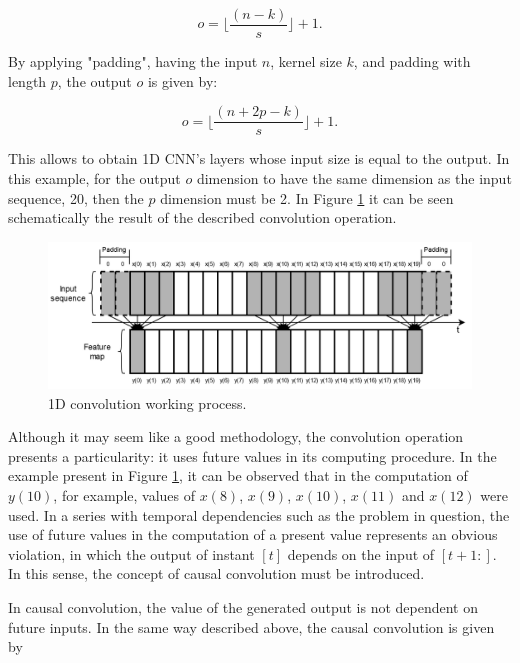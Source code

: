 \begin{equation}
    o = \lfloor \frac{(n-k)}{s} \rfloor + 1 .
\end{equation}

By applying "padding", having the input $n$, kernel size $k$, and padding with length $p$, the output $o$ is given by:

\begin{equation}
    o = \lfloor \frac{(n+2p-k)}{s} \rfloor + 1 .
\end{equation}

This allows to obtain \ac{1D CNN}'s layers whose input size is equal to the output. In this example, for the output $o$ dimension to have the same dimension as the input sequence, 20, then the $p$ dimension must be 2. In Figure \ref{conv1} it can be seen schematically the result of the described convolution operation.

\begin{figure}[h!]
    \centering
    \begin{center}
    \includegraphics[width=1\textwidth]{Images/conv1.png}
    \caption{1D convolution working process.}
    \label{conv1}
    \end{center}
\end{figure}

Although it may seem like a good methodology, the convolution operation presents a particularity: it uses future values in its computing procedure. In the example present in Figure \ref{conv1}, it can be observed that in the computation of $y(10)$, for example, values of $x(8)$, $x(9)$, $x(10)$, $x(11)$ and $x(12)$ were used. In a series with temporal dependencies such as the problem in question, the use of future values in the computation of a present value represents an obvious violation, in which the output of instant $[t]$ depends on the input of $[t+1:]$. In this sense, the concept of causal convolution must be introduced. 

In causal convolution, the value of the generated output is not dependent on future inputs. In the same way described above, the causal convolution is given by 


